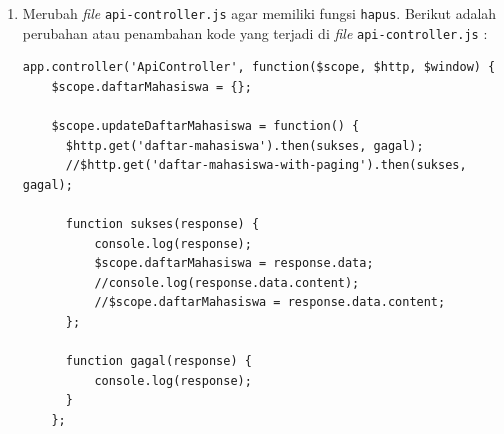 \begin{enumerate}
\begin{lstlisting}
        <table class="table table-striped">
            <thead>
                <tr>
                    <th scope="col">NIM</th>
                    <th scope="col">NAMA</th>
                    <th scope="col">JURUSAN</th>
                </tr>
            </thead>
            <tbody>
                <tr ng-repeat="mhs in daftarMahasiswa">
                    <td>{{mhs.nim}}</td>
                    <td>{{mhs.nama}}</td>
                    <td>{{mhs.jurusan}}</td>
                    <td>
                        <button class="btn btn-warning" ng-click="ubah(mhs)">
                            Ubah
                        </button>
                    </td>
                    (*\texttt{<td> }*)
                      (*\texttt{<button class="btn btn-danger" }*)
                          (*\texttt{ng-click="hapus(mhs)"> }*)
                        (*\texttt{Hapus }*)
                      (*\texttt{</button> }*)
                    (*\texttt{</td> }*)
                </tr>
            </tbody>            
            <tfoot>
                <tr>
                    <td>
                        <a class="btn btn-primary" href="/form" role="button">Tambah</a>
                    </td>
                </tr>
            </tfoot>
        </table>
    </div>
</body>
</html>
	\end{lstlisting}
	
	Pada baris ke-40, ada parameter \texttt{ng-click} yang akan memanggil fungsi \texttt{hapus} dengan parameter \texttt{mhs} yang terpilih.
	
	\item Merubah \textit{file} \texttt{api-controller.js} agar memiliki fungsi \texttt{hapus}. Berikut adalah perubahan atau penambahan kode yang terjadi di \textit{file} \texttt{api-controller.js} :
	
	\begin{lstlisting}
app.controller('ApiController', function($scope, $http, $window) {
    $scope.daftarMahasiswa = {};
    
    $scope.updateDaftarMahasiswa = function() {
      $http.get('daftar-mahasiswa').then(sukses, gagal);
      //$http.get('daftar-mahasiswa-with-paging').then(sukses, gagal);
      
      function sukses(response) {
          console.log(response);
          $scope.daftarMahasiswa = response.data;
          //console.log(response.data.content);
          //$scope.daftarMahasiswa = response.data.content;
      };
      
      function gagal(response) {
          console.log(response);
      }
    };
    

\end{lstlisting}
\end{enumerate}
